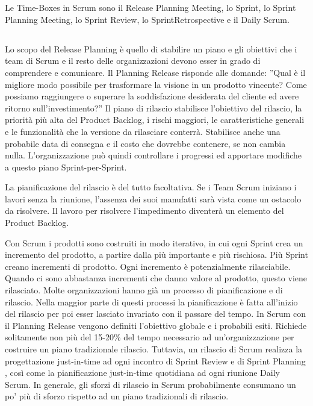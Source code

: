 \section*{\color{Blue}{TIME-BOXES}}
\label{sec:timeboxes}
Le Time-Boxes in Scrum sono il Release Planning Meeting, lo Sprint, lo Sprint Planning Meeting, lo Sprint Review, lo
SprintRetrospective e il Daily Scrum.

\subsection*{\color{Blue}{RELEASE PLANNING MEETING}}
\label{sec:releaseplanningmeeting}
Lo scopo del Release Planning \`e quello di stabilire un piano e gli obiettivi che i team di Scrum e il resto delle
organizzazioni devono esser in grado di comprendere e comunicare. Il Planning Release risponde alle domande: ''Qual \`e
il migliore modo possibile per trasformare la visione in un prodotto vincente? Come possiamo raggiungere o superare la
soddisfazione desiderata del cliente ed avere ritorno sull'investimento?'' Il piano di rilascio stabilisce l'obiettivo
del rilascio, la priorit\`a pi\`u alta del Product Backlog, i rischi maggiori, le caratteristiche generali e le
funzionalit\`a che la versione da rilasciare conterr\`a. Stabilisce anche una probabile data di consegna e il costo che
dovrebbe contenere, se non cambia nulla. L'organizzazione pu\`o quindi controllare i progressi ed apportare modifiche a
questo piano Sprint-per-Sprint.
\newline

La pianificazione del rilascio \`e del tutto facoltativa. Se i Team Scrum iniziano i lavori senza la riunione,
l'assenza dei suoi manufatti sar\`a vista come un ostacolo da risolvere. Il lavoro per risolvere l'impedimento
diventer\`a un elemento del Product Backlog.
\newline

Con Scrum i prodotti sono costruiti in modo iterativo, in cui ogni Sprint crea un incremento del prodotto, a partire
dalla pi\`u importante e pi\`u rischiosa. Pi\`u Sprint creano incrementi di prodotto. Ogni incremento \`e
potenzialmente rilasciabile. Quando ci sono abbastanza incrementi che danno valore al prodotto, questo viene
rilasciato. Molte organizzazioni hanno gi\`a un processo di pianificazione e di rilascio. Nella maggior parte di questi
processi la pianificazione \`e fatta all'inizio del rilascio per poi esser lasciato invariato con il passare del tempo.
In Scrum con il Planning Release vengono definiti l'obiettivo globale e i probabili esiti. Richiede solitamente non
pi\`u del 15-20\% del tempo necessario ad un'organizzazione per costruire un piano tradizionale rilascio. Tuttavia, un
rilascio di Scrum realizza la progettazione just-in-time ad ogni incontro di Sprint Review e di Sprint Planning ,
cos\`i come la pianificazione just-in-time quotidiana ad ogni riunione Daily Scrum. In generale, gli sforzi di rilascio
in Scrum probabilmente consumano un po' pi\`u di sforzo rispetto ad un piano tradizionali di rilascio.
\newline


